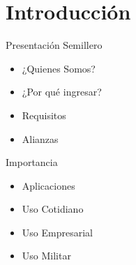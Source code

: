 \section{Introducción}

\begin{frame}{Presentación Semillero}

	\begin{itemize}
		\item ¿Quienes Somos?
		\item ¿Por qué ingresar?
		\item Requisitos
		\item Alianzas
	\end{itemize}
  
\end{frame}

\begin{frame}{Importancia}
	\begin{itemize}
		\item Aplicaciones
		\item Uso Cotidiano
		\item Uso Empresarial
		\item Uso Militar
	\end{itemize}
\end{frame}

